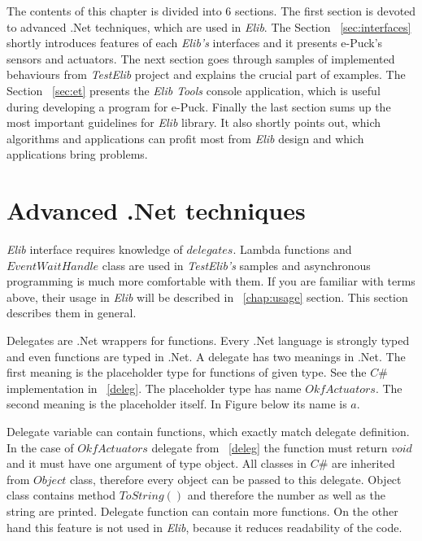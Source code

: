   The contents of this chapter is divided into 6 sections.
  The first section is devoted to advanced .Net techniques, which are used in {\it Elib}.
  The Section ~\ref{sec:interfaces} shortly introduces features of each {\it Elib's} interfaces and 
  it presents e-Puck's sensors and actuators.
  The next section goes through samples of implemented behaviours from {\it TestElib} project and explains the crucial part of examples.
  The Section ~\ref{sec:et} presents the {\it Elib Tools} console application, which is useful during developing a program for e-Puck.
  Finally the last section sums up the most important guidelines for {\it Elib} library.
  It also shortly points out, which algorithms and applications can profit most
  from {\it Elib} design and which applications bring problems.
  
\section{Advanced .Net techniques} \label{sec:net}
  {\it Elib} interface requires knowledge of $delegates$. Lambda functions and $EventWaitHandle$ class
  are used in {\it TestElib's} samples and asynchronous programming is much more comfortable with them.
  If you are familiar with terms above, their usage in {\it Elib} will be described in ~\ref{chap:usage} section.
  This section describes them in general.

  Delegates are .Net wrappers for functions. Every .Net language is strongly typed and even functions are typed in .Net.
  A delegate has two meanings in .Net. The first meaning is the placeholder type for functions of given type. 
  See the $C\#$ implementation in ~\ref{deleg}. The placeholder type has name $OkfActuators$.
  The second meaning is the placeholder itself. In Figure below its name is $a$.

  Delegate variable can contain functions, which exactly match delegate definition. In the case of $OkfActuators$ 
  delegate from ~\ref{deleg} the function must return
  $void$ and it must have one argument of type object. All classes in $C\#$ are inherited from $Object$ class, 
  therefore every object can be passed to this delegate. 
  Object class contains method $ToString()$ and therefore the number as well as the string are printed.  
  Delegate function can contain more functions. On the other hand this feature is not used in {\it Elib}, 
  because it reduces readability of the code.
  

